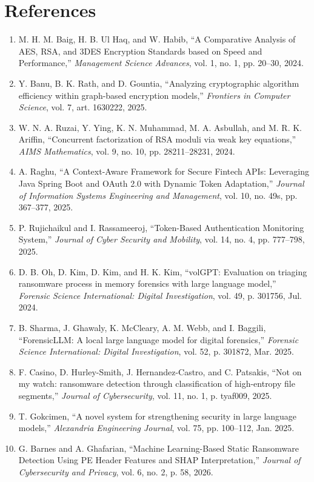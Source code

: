 \documentclass[10pt]{article}
\begin{document}
\section*{References}
\begin{enumerate}
\item M. H. M. Baig, H. B. Ul Haq, and W. Habib, ``A Comparative Analysis of AES, RSA, and 3DES Encryption Standards based on Speed and Performance,'' \emph{Management Science Advances}, vol. 1, no. 1, pp. 20--30, 2024.
\item Y. Banu, B. K. Rath, and D. Gountia, ``Analyzing cryptographic algorithm efficiency within graph-based encryption models,'' \emph{Frontiers in Computer Science}, vol. 7, art. 1630222, 2025.
\item W. N. A. Ruzai, Y. Ying, K. N. Muhammad, M. A. Asbullah, and M. R. K. Ariffin, ``Concurrent factorization of RSA moduli via weak key equations,'' \emph{AIMS Mathematics}, vol. 9, no. 10, pp. 28211--28231, 2024.
\item A. Raghu, ``A Context-Aware Framework for Secure Fintech APIs: Leveraging Java Spring Boot and OAuth 2.0 with Dynamic Token Adaptation,'' \emph{Journal of Information Systems Engineering and Management}, vol. 10, no. 49s, pp. 367--377, 2025.
\item P. Rujichaikul and I. Rassameeroj, ``Token-Based Authentication Monitoring System,'' \emph{Journal of Cyber Security and Mobility}, vol. 14, no. 4, pp. 777--798, 2025.
\item D. B. Oh, D. Kim, D. Kim, and H. K. Kim, ``volGPT: Evaluation on triaging ransomware process in memory forensics with large language model,'' \emph{Forensic Science International: Digital Investigation}, vol. 49, p. 301756, Jul. 2024.
\item B. Sharma, J. Ghawaly, K. McCleary, A. M. Webb, and I. Baggili, ``ForensicLLM: A local large language model for digital forensics,'' \emph{Forensic Science International: Digital Investigation}, vol. 52, p. 301872, Mar. 2025.
\item F. Casino, D. Hurley-Smith, J. Hernandez-Castro, and C. Patsakis, ``Not on my watch: ransomware detection through classification of high-entropy file segments,'' \emph{Journal of Cybersecurity}, vol. 11, no. 1, p. tyaf009, 2025.
\item T. Gokcimen, ``A novel system for strengthening security in large language models,'' \emph{Alexandria Engineering Journal}, vol. 75, pp. 100--112, Jan. 2025.
\item G. Barnes and A. Ghafarian, ``Machine Learning-Based Static Ransomware Detection Using PE Header Features and SHAP Interpretation,'' \emph{Journal of Cybersecurity and Privacy}, vol. 6, no. 2, p. 58, 2026.

\end{enumerate}
\end{document}
